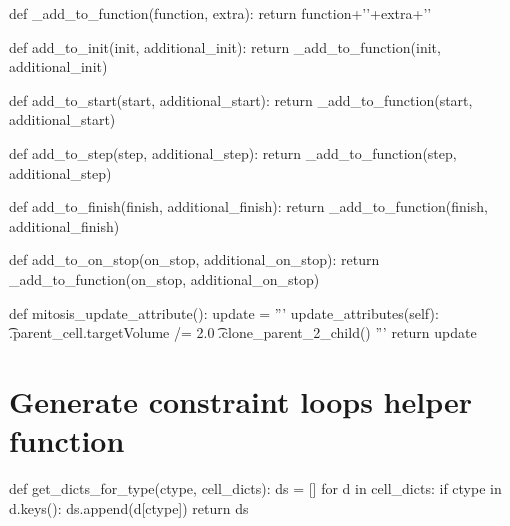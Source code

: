 \begin{python}
def _add_to_function(function, extra):
    return function+'\n'+extra+'\n'
\end{python}
\begin{python}
def add_to_init(init, additional_init):
    return _add_to_function(init, additional_init)
\end{python}
\begin{python}
def add_to_start(start, additional_start):
    return _add_to_function(start, additional_start)
\end{python}
\begin{python}
def add_to_step(step, additional_step):
    return _add_to_function(step, additional_step)
\end{python}
\begin{python}
def add_to_finish(finish, additional_finish):
    return _add_to_function(finish, additional_finish)
\end{python}
\begin{python}
def add_to_on_stop(on_stop, additional_on_stop):
    return _add_to_function(on_stop, additional_on_stop)
\end{python}

\begin{python}
def mitosis_update_attribute():
    update = '''
\tdef update_attributes(self):
\t\tself.parent_cell.targetVolume /= 2.0
\t\tself.clone_parent_2_child()
'''
    return update
\end{python}

\section{Generate constraint loops helper function}\label{code:trans:cc3d:constraint-loops-helper-function}

\begin{python}
def get_dicts_for_type(ctype, cell_dicts):
    ds = []
    for d in cell_dicts:
        if ctype in d.keys():
            ds.append(d[ctype])
    return ds
\end{python}

